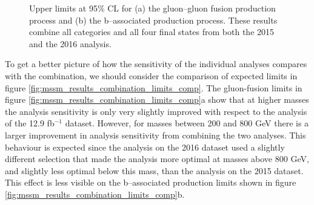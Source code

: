 \begin{figure}[h!]
\begin{center}
\end{center}
\caption{Upper limits at 95\% CL for (a) the gluon--gluon fusion production
process and (b) the b--associated production process. These results
combine all categories and all four final states from both the 2015
and the 2016 analysis.}
\label{fig:mssm_results_combination_limits}
\end{figure}

To get a better picture of how the sensitivity of the individual analyses compares
with the combination, we should consider the comparison
of expected limits in figure \ref{fig:mssm_results_combination_limits_comp}. The
gluon-fusion limits in figure \ref{fig:mssm_results_combination_limits_comp}a show that at
higher masses the analysis sensitivity is only very slightly improved with respect to the 
analysis of the 12.9 fb$^{-1}$ dataset. However, for masses between 200 and 800 GeV
there is a larger improvement in analysis sensitivity from combining the two analyses.
This behaviour is expected since the analysis on the 2016 dataset used a slightly different
selection that made the analysis more optimal at masses above 800 GeV,
and slightly less optimal below this mass, than the analysis on the 2015 dataset. This
effect is less visible on the b--associated production limits shown in figure \ref{fig:mssm_results_combination_limits_comp}b.

